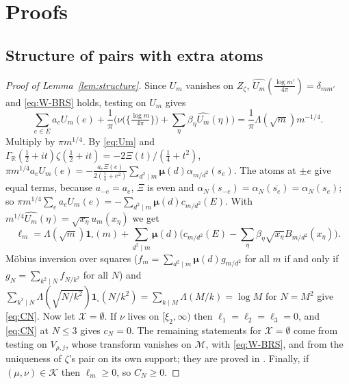 \documentclass[11pt]{amsart}
\newcommand{\one}{\mathbf 1}
\newcommand{\xin}[1]{\xi_{#1}}
\newcommand{\BRS}{\mathcal M}
\newcommand{\GR}{\Gamma_{\mathbb R}}
\newcommand{\Zz}{Z_\zeta}
\newcommand{\Kad}{\mathcal K}
\theoremstyle{definition}
\theoremstyle{remark}
\numberwithin{equation}{section}
\begin{document}
\appendix
\section{Proofs}\label{app:proofs}

\subsection{Structure of pairs with extra atoms}\label{app:proofs-structure}
\begin{proof}[Proof of Lemma~\textup{\ref{lem:structure}}]
Since $U_m$ vanishes on $\Zz$, $\widehat{U_m}(\frac{\log m'}{4\pi})=\delta_{mm'}$ and \eqref{eq:W-BRS} holds, testing on $U_m$ gives
\[
\sum_{e\in E}a_eU_m(e)+\frac1\pi\Big(\nu\big(\{\tfrac{\log m}{4\pi}\}\big)+\sum_\eta\beta_\eta\widehat{U_m}(\eta)\Big)=\frac1\pi\Lambda(\sqrt m)m^{-1/4}.
\]
Multiply by $\pi m^{1/4}$. By \eqref{eq:Um} and $\GR(\frac12+it)\zeta(\frac12+it)=-2\Xi(t)/(\frac14+t^2)$,
$\pi m^{1/4}a_eU_m(e)=-\frac{a_e\Xi(e)}{2(\frac14+e^2)}\sum_{d^2\mid m}\boldsymbol\mu(d)\alpha_{m/d^2}(s_e)$. The atoms at $\pm e$ give equal
terms, because $a_{-e}=a_e$, $\Xi$ is even and $\alpha_N(s_{-e})=\alpha_N(\overline{s_e})=\alpha_N(s_e)$; so
$\pi m^{1/4}\sum_ea_eU_m(e)=-\sum_{d^2\mid m}\boldsymbol\mu(d)c_{m/d^2}(E)$. With $m^{1/4}\widehat{U_m}(\eta)=\sqrt{x_\eta}u_m(x_\eta)$ we get
\[
\ell_m=\Lambda(\sqrt m)\one_\square(m)+\sum_{d^2\mid m}\boldsymbol\mu(d)\Big(c_{m/d^2}(E)-\sum_\eta\beta_\eta\sqrt{x_\eta}B_{m/d^2}(x_\eta)\Big).
\]
M\"obius inversion over squares ($f_m=\sum_{d^2\mid m}\boldsymbol\mu(d)g_{m/d^2}$ for all $m$ if and only if
$g_N=\sum_{k^2\mid N}f_{N/k^2}$ for all $N$) and $\sum_{k^2\mid N}\Lambda(\sqrt{N/k^2})\one_\square(N/k^2)=\sum_{k\mid M}\Lambda(M/k)=\log M$ for
$N=M^2$ give \eqref{eq:CN}. Now let $\mathcal X=\emptyset$. If $\nu$ lives on $[\xin2,\infty)$ then $\ell_1=\ell_2=\ell_3=0$, and
\eqref{eq:CN} at $N\le3$ gives $c_N=0$. The remaining statements for $\mathcal X=\emptyset$ come from testing on $V_{\rho,j}$,
whose transform vanishes on $\BRS$, with \eqref{eq:W-BRS}, and from the uniqueness of $\zeta$'s pair on its own support; they
are proved in \cite{PaperI}. Finally, if $(\mu,\nu)\in\Kad$ then $\ell_m\ge0$, so $C_N\ge0$.
\end{proof}
\end{document}
